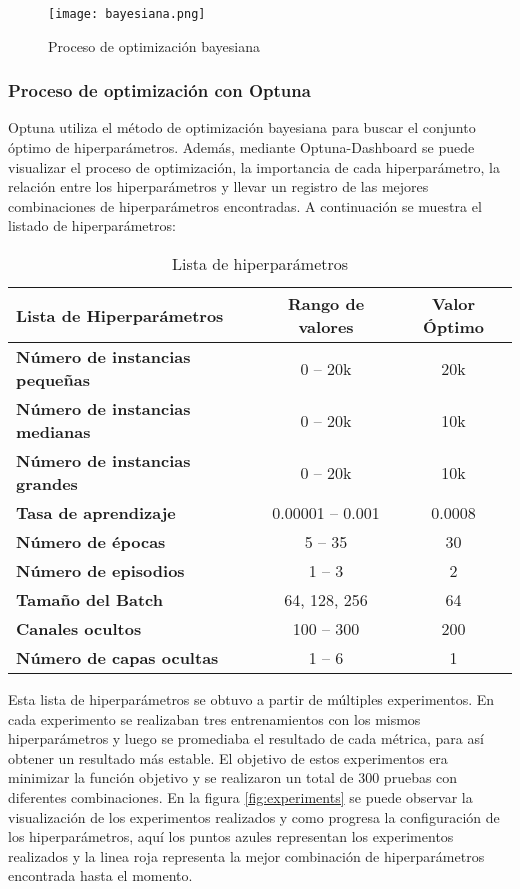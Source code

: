 \begin{figure}[ht]
    \centering
    \texttt{[image: bayesiana.png]}
    \caption{Proceso de optimización bayesiana}\label{fig:bayesiana}
\end{figure}

\subsubsection{Proceso de optimización con Optuna}
Optuna utiliza el método de optimización bayesiana para buscar el conjunto óptimo de
hiperparámetros. Además, mediante Optuna-Dashboard se puede visualizar el proceso de
optimización, la importancia de cada hiperparámetro, la relación entre los hiperparámetros
y llevar un registro de las mejores combinaciones de hiperparámetros encontradas. A 
continuación se muestra el listado de hiperparámetros:

\begin{table}[ht]
    \centering
    \begin{tabular}[ht]{l|c|c} 
        \textbf{Lista de Hiperparámetros} & \textbf{Rango de valores} & \textbf{Valor Óptimo}\\
        \hline
        \textbf{Número de instancias pequeñas} & 0 -- 20k & 20k\\
        \textbf{Número de instancias medianas} & 0 -- 20k & 10k\\
        \textbf{Número de instancias grandes}  & 0 -- 20k & 10k \\
        \textbf{Tasa de aprendizaje} & 0.00001 -- 0.001 & 0.0008\\
        \textbf{Número de épocas} & 5 -- 35 & 30 \\ 
        \textbf{Número de episodios} & 1 -- 3 & 2 \\
        \textbf{Tamaño del Batch} & 64, 128, 256 & 64\\
        \textbf{Canales ocultos} & 100 -- 300 & 200 \\
        \textbf{Número de capas ocultas} & 1 -- 6 & 1 \\
    \end{tabular}
    \caption{Lista de hiperparámetros}
    \label{tab:hyperparams}
\end{table}

Esta lista de hiperparámetros se obtuvo a partir de múltiples experimentos. En cada 
experimento se realizaban tres entrenamientos con los mismos hiperparámetros y luego
se promediaba el resultado de cada métrica, para así obtener un resultado más estable.
El objetivo de estos experimentos era minimizar la función objetivo y se realizaron
un total de 300 pruebas con diferentes combinaciones. En la figura \ref{fig:experiments}
se puede observar la visualización de los experimentos realizados y como progresa la
configuración de los hiperparámetros, aquí los puntos azules representan los experimentos
realizados y la linea roja representa la mejor combinación de hiperparámetros encontrada
hasta el momento.

